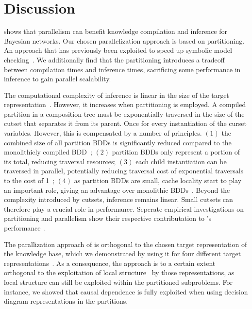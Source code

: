 
\section{Discussion}
\label{sec:conclusion}

\toolname shows that parallelism can benefit knowledge compilation and inference for Bayesian networks. Our chosen parallelization approach is based on partitioning. An approach that has previously been exploited to speed up symbolic model checking~\cite{sylvan-journal,narayan1996partitioned,sahoo2004partitioning}.  We additionally find that the partitioning introduces a tradeoff between compilation times and inference times, sacrificing some performance in inference to gain parallel scalability.

The computational complexity of inference is linear in the size of the target representation~\cite{darwiche2002knowledge}. However, it increases when partitioning is employed. A compiled partition in a composition-tree must be exponentially traversed in the size of the cutset that separates it from its parent. Once for every instantiation of the curset variables. However, this is compensated by a number of principles. $(1)$ the combined size of all partition BDDs is significantly reduced compared to the monolithicly compiled BDD~\cite{dal2017reducing}; $(2)$ partition BDDs only represent a portion of its total, reducing traversal resources; $(3)$ each child instantiation can be traversed in parallel, potentially reducing traversal cost of exponential traversals to the cost of 1~\cite{dal2021compositional}; $(4)$ as partition BDDs are small, cache locality start to play an important role, giving an advantage over monolithic BDDs~\cite{dal2018parallel}. Beyond the complexity introduced by cutsets, inference remains linear. Small cutsets can therefore play a crucial role in performance. Seperate empirical investigations on partitioning and parallelism show their respective contributation to \toolname's performance~\cite{dal2018parallel,dal2021compositional}.



The parallization approach of \toolname is orthogonal to the chosen target representation of the knowledge base, which we demonstrated by using it for four different target representations~\cite{dal2018parallel}. As a consequence, the approach is to a certain extent orthogonal to the exploitation of local structure~\cite{shih2019compiling} by those representations, as local structure can still be exploited within the partitioned subproblems. For instance, we showed that causal dependence is fully exploited when using decision diagram representations in the partitions.

